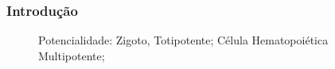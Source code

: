 \documentclass[brazil]{beamer}
\begin{document}
  \begin{frame}
    \frametitle{Introdução}
    \begin{minipage}{1\textwidth}
	\begin{figure}
	    \centering
	  \caption{\tiny Potencialidade:  Zigoto, Totipotente;  Célula Hematopoiética Multipotente;}
	  \label{fig:1}
	\end{figure}
    \end{minipage}
  \end{frame}
\end{document}
